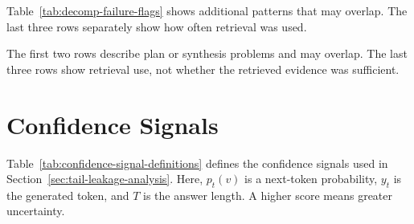 Table~\ref{tab:decomp-failure-flags} shows additional patterns that may overlap. The last three rows separately show how often retrieval was used.

\begin{table}[h]
    \centering
    \caption[Additional Decomposition Patterns]{Additional patterns in decomposition errors.}
    \label{tab:decomp-failure-flags}
    \setlength{\tabcolsep}{6pt}
    \scriptsize
\end{table}

The first two rows describe plan or synthesis problems and may overlap. The last three rows show retrieval use, not whether the retrieved evidence was sufficient.

\clearpage
\section{Confidence Signals}
\label{app:confidence-signals}

Table~\ref{tab:confidence-signal-definitions} defines the confidence signals used in Section~\ref{sec:tail-leakage-analysis}. Here, $p_t(v)$ is a next-token probability, $y_t$ is the generated token, and $T$ is the answer length. A higher score means greater uncertainty.

